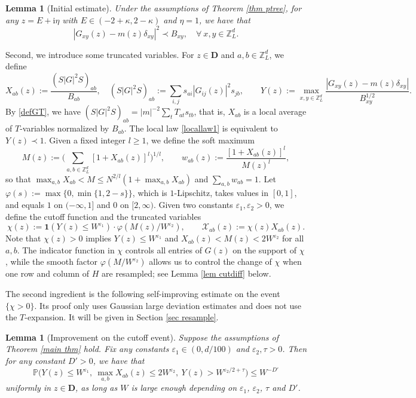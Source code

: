 \documentclass{article}
\newcommand{\1}{\mathds{1}}
\numberwithin{equation}{section}
\newcommand{\be}{\begin{equation}}
\newcommand{\ee}{\end{equation}}
\newcommand{\e}{{\varepsilon}}
\renewcommand{\cal}{\mathcal}
\newcommand{\ii}{\mathrm{i}} %
\renewcommand{\leq}{\leqslant}
\renewcommand{\geq}{\geqslant}
\renewcommand{\le}{\leq}
\renewcommand{\ge}{\geq}
\renewcommand{\P}{\mathbb{P}}
\newcommand{\Z}{\mathbb{Z}}
\theoremstyle{plain} %
\newtheorem{lemma}[theorem]{Lemma}
\theoremstyle{remark}
\begin{document}
 
 \begin{lemma}[Initial estimate] \label{eta1case0} 
 	Under the assumptions of Theorem \ref{thm ptree}, for any $z=E+\ii\eta$ with $E\in (-2+\kappa,2-\kappa)$ and $\eta=1$, we have that 
 	\be\label{locallaw eta1}
 	|G_{xy} (z) -m(z)\delta_{xy}|^2\prec  B_{xy}  ,\quad \forall \ x,y \in \Z_L^d.  
 	\ee
 \end{lemma}
 
 
Second, we introduce some truncated variables. For $z\in \mathbf D$ and $a,b\in \Z_L^d$, we define
\be\label{def XY}
X_{ab}(z):=\frac{(S|G|^2S)_{ab}}{B_{ab}},\quad (S|G|^2S)_{ab}:=\sum_{i,j}s_{ai}|G_{ij}(z)|^2 s_{jb},\qquad Y(z):=\max_{x,y\in \Z_L^d}\frac{|G_{xy}(z)-m(z)\delta_{xy}|}{B_{xy}^{1/2}} .
\ee
By \eqref{defGT}, we have $(S|G|^2S)_{ab}=|m|^{-2}\sum_{t}T_{at}s_{tb}$, that is, $X_{ab}$ is a local average of $T$-variables normalized by $B_{ab}$. The local law \eqref{locallaw1} is equivalent to $Y(z)\prec 1$. Given a fixed integer $l\ge 1$, we define the soft maximum
\be\label{def softmax}
M(z):=\Big(\sum_{a,b\in \Z_L^d}\left[1+X_{ab}(z)\right]^l\Big)^{1/l},\qquad w_{ab}(z):=\frac{\left[1+X_{ab}(z)\right]^l}{M(z)^l},
\ee
so that $\max_{a,b}X_{ab}<M\le N^{2/l}(1+\max_{a,b}X_{ab})$ and $\sum_{a,b}w_{ab}=1$. Let $\varphi(s):=\max\{0,\min\{1,2-s\}\}$, which is $1$-Lipschitz, takes values in $[0,1]$, and equals $1$ on $(-\infty,1]$ and $0$ on $[2,\infty)$. Given two constants $\e_1,\e_2>0$, we define the cutoff function and the truncated variables
\be\label{def cutoff}
\chi(z):=\mathbf 1\left(Y(z)\le W^{\e_1}\right)\cdot \varphi\left(M(z)/W^{\e_2}\right),\qquad \cal X_{ab}(z):=\chi(z) X_{ab}(z).
\ee
Note that $\chi(z)>0$ implies $Y(z)\le W^{\e_1}$ and $X_{ab}(z)<M(z)<2W^{\e_2}$ for all $a,b$. The indicator function in $\chi$ controls all entries of $G(z)$ on the support of $\chi$, while the smooth factor $\varphi(M/W^{\e_2})$ allows us to control the change of $\chi$ when one row and column of $H$ are resampled; see Lemma \ref{lem cutdiff} below.

The second ingredient is the following self-improving estimate on the event $\{\chi>0\}$. Its proof only uses Gaussian large deviation estimates and does not use the $T$-expansion. It will be given in Section \ref{sec resample}.

\begin{lemma}[Improvement on the cutoff event]\label{lem: ini bound}
Suppose the assumptions of Theorem \ref{main thm} hold. Fix any constants $\e_1\in (0,d/100)$ and $\e_2,\tau>0$. Then for any constant $D'>0$, we have that
\be\label{cut improve}
\P\Big(Y(z)\le W^{\e_1},\ \max_{a,b}X_{ab}(z)\le 2W^{\e_2},\ Y(z)> W^{\e_2/2+\tau}\Big)\le W^{-D'}
\ee
uniformly in $z\in \mathbf D$, as long as $W$ is large enough depending on $\e_1$, $\e_2$, $\tau$ and $D'$.
\end{lemma}
\end{document}
